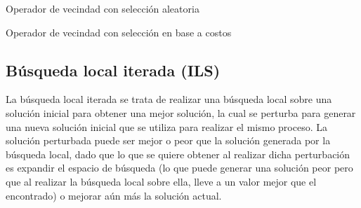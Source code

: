 \documentclass{ci5652}
\begin{document}
\begin{algorithm}
    \DontPrintSemicolon
    \vspace*{0.1cm}
    \vspace*{0.1cm}
    \caption{Operador de vecindad con selección aleatoria}
\end{algorithm}

\begin{algorithm}
    \DontPrintSemicolon
    \vspace*{0.1cm}
    \vspace*{0.1cm}
    \caption{Operador de vecindad con selección en base a costos}
\end{algorithm}

\subsection{Búsqueda local iterada (ILS)}
La búsqueda local iterada se trata de realizar una búsqueda local sobre una solución inicial para obtener una mejor solución, la cual se perturba para generar una nueva solución inicial que se utiliza para realizar el mismo proceso. La solución perturbada puede ser mejor o peor que la solución generada por la búsqueda local, dado que lo que se quiere obtener al realizar dicha perturbación es expandir el espacio de búsqueda (lo que puede generar una solución peor pero que al realizar la búsqueda local sobre ella, lleve a un valor mejor que el encontrado) o mejorar aún más la solución actual.
\end{document}
